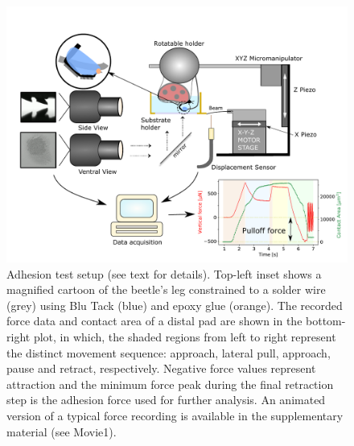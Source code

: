 \documentclass[vruler,JEB]{COB}%
\begin{document}
\begin{figure}[!t]
\centering
\includegraphics[width=6in]{Figure1-Setup_schematic}%
\caption[]{Adhesion test setup (see text for details). Top-left inset shows a magnified cartoon of the beetle's leg constrained to a solder wire (grey) using Blu Tack (blue) and epoxy glue (orange). The recorded force data and
contact area of a distal pad are shown in the bottom-right plot, in which, the shaded
regions from left to right represent the distinct movement sequence: approach, lateral pull, approach, pause and retract, respectively. Negative force values
represent attraction and the minimum force peak during the final retraction
step is the adhesion force used for further analysis. An animated version of a typical force recording is available in the supplementary material (see Movie1).}
\label{fig:Setup}
\end{figure}


\end{document}
